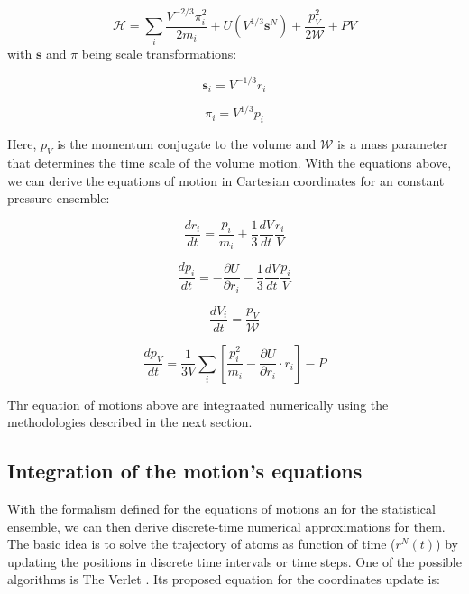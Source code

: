 \begin{equation}
\mathcal{H} =  \sum_{i} \frac{V^{-2/3} \pi _{i}^{2}}{2 m_{i}} + U(V^{1/3} \mathbf{s}^{N})  + \frac{p_{V} ^{2} }{2\mathcal{W}} + PV
\end{equation}
with $\mathbf{s}$ and $\pi$ being scale transformations:

\begin{equation}
\mathbf{s} _{i} =  V^{-1/3} r_{i} 
\end{equation}

\begin{equation}
\pi _{i} =  V^{1/3} p _{i}
\end{equation}

Here, $p_{V} $ is the momentum conjugate to the volume and $\mathcal{W}$ is a mass parameter that determines the time scale of the volume motion. With the equations above, we can derive the equations of motion in Cartesian coordinates for an constant pressure ensemble:

\begin{equation}
\frac{dr_{i}}{dt} = \frac{p_{i}}{m_{i}} + \frac{1}{3} \frac{dV}{dt} \frac{r_{i}}{V}
\end{equation}

\begin{equation}
\frac{dp_{i}}{dt} = -  \frac{\partial U}{\partial r_{i}} - \frac{1}{3} \frac{dV}{dt} \frac{p_{i}}{V}
\end{equation}

\begin{equation}
\frac{dV_{i}}{dt} = \frac{p_{V}}{\mathcal{W}}
\end{equation}

\begin{equation}
\frac{dp_{V}}{dt} = \frac{1}{3V} \sum_{i} \left [ \frac{p_{i}^{2}}{m_{i}} -  \frac{\partial U}{\partial r_{i}} \cdot r_{i} \right] -P
\end{equation}

Thr equation of motions above are integraated numerically using the methodologies described in the next section.


\subsection{Integration of the motion's equations}

With the formalism defined for the equations of motions an for the statistical ensemble, we can then derive discrete-time numerical approximations for them.  The basic idea is to solve the trajectory of atoms as function of time ($r^{N}(t)$) by updating the positions in discrete time intervals or time steps. One of the possible algorithms is The Verlet \cite{verlet}. Its proposed equation for the coordinates update is:  

